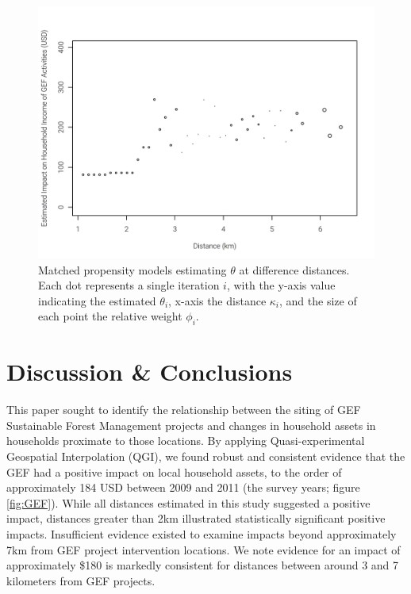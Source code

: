 \documentclass[sustainability,article,submit,moreauthors,pdftex]{Definitions/mdpi}
\begin{document}
\begin{figure}[!ht]
\includegraphics[width=\textwidth]{Figures/only_matches.png}
\caption{Matched propensity models estimating $\theta$ at difference distances.  Each dot represents a single iteration $i$, with the y-axis value indicating the estimated $\theta_{i}$, x-axis the distance $\kappa_{i}$, and the size of each point the relative weight $\phi_{i}$.}
\label{fig:exNoTrend}
\end{figure}

\section{Discussion \& Conclusions}\label{conclusion}
This paper sought to identify the relationship between the siting of GEF Sustainable Forest Management projects and changes in household assets in households proximate to those locations. By applying Quasi-experimental Geospatial Interpolation (QGI), we found robust and consistent evidence that the GEF had a positive impact on local household assets, to the order of approximately 184 USD between 2009 and 2011 (the survey years; figure \ref{fig:GEF}).  While all distances estimated in this study suggested a positive impact, distances greater than 2km illustrated statistically significant positive impacts.  Insufficient evidence existed to examine impacts beyond approximately 7km from GEF project intervention locations.  We note evidence for an impact of approximately \$180 is markedly consistent for distances between around 3 and 7 kilometers from GEF projects.
\end{document}
